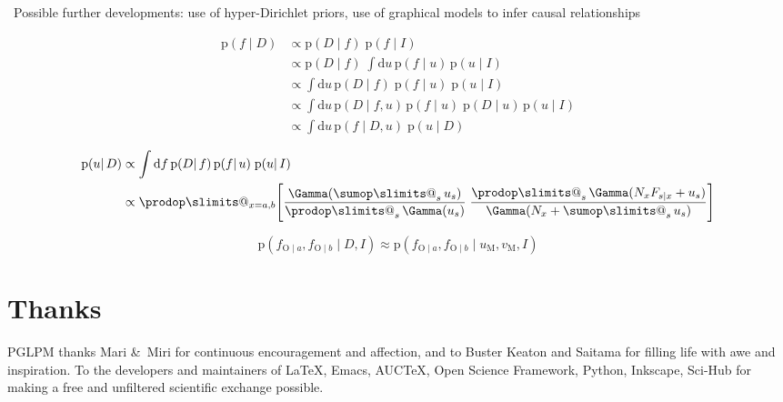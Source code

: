 \documentclass[\ifafour a4paper,12pt,\else a5paper,10pt,\fi%
onecolumn,oneside,article,%
british%
]{memoir}
\makeatletter
\theoremstyle{remark}
\theoremstyle{innote}
\def\sum{\DOTSI\sumop\slimits@}
\def\prod{\DOTSI\prodop\slimits@}
\newcommand*{\citep}{\parencites}
\newcommand*{\amp}{\&}
\newenvironment{acknowledgements}{\section*{Thanks}\addcontentsline{toc}{section}{Thanks}}{\par}
\newcommand*{\di}{\mathrm{d}}%
\newcommand*{\pf}{\mathrm{p}}%
\renewcommand*{\|}{\mathpunct{|}}
\newcommand*{\tprod}{\mathop{\textstyle\prod}\nolimits}
\newcommand*{\tsum}{\mathop{\textstyle\sum}\nolimits}
\newcommand*{\puzzle}{\maltese}
\newcommand{\mynote}[1]{ {\color{notecolour}\puzzle\ #1}}
\newcommand*{\yD}{D}
\newcommand*{\yI}{I}
\newcommand*{\ya}{a}
\newcommand*{\yb}{b}
\newcommand*{\ysA}{\textrm{O}}%
\newcommand*{\yua}{u}
\newcommand*{\yub}{v}
\newcommand*{\yuam}{\yua_{\text{M}}}
\newcommand*{\yubm}{\yub_{\text{M}}}
\makeatother
\begin{document}
\mynote{Possible further developments: use of hyper-Dirichlet priors, use
  of graphical models to infer causal relationships
  \citep{pearl2000_r2009}}

\[
\begin{aligned}
\pf(f \|\yD)  &\propto \pf(\yD \| f)\;\pf(f \| \yI)
  \\
  &\propto \pf(\yD \| f)\;\int\di u\, \pf(f \|u)\, \pf(u\| \yI)
  \\
  &\propto \int\di u\,\pf(\yD \| f)\; \pf(f \|u)\; \pf(u\| \yI)
  \\
  &\propto \int\di u\,\pf(\yD \| f,u)\, \pf(f \|u)\;
    \pf(\yD \| u)\, \pf(u\| \yI)
  \\
  &\propto \int\di u\,\pf(f \| D,u)\;
    \pf(u \| \yD)
\end{aligned}
\]

\[
  \begin{aligned}
    \pf(u \|\yD)
    &\propto \int\di f\, \pf(\yD \| f)\,\pf(f \| u)\;\pf(u \| \yI)
    \\
    &\propto
      \prod_{x=\ya,\yb}\Biggl[ 
      \frac{\Gamma(\tsum_su_s)}
      {\tprod_s\Gamma(u_s)}\;
      \frac{\tprod_s\Gamma(N_xF_{s\|x}+u_s)}
      {\Gamma(N_x+\tsum_su_s)}
       \Biggr]
  \end{aligned}
\]


\[
  \pf(f_{\ysA\|\ya}, f_{\ysA\|\yb} \| \yD, \yI) \approx
  \pf(f_{\ysA\|\ya}, f_{\ysA\|\yb}\| \yuam,\yubm,\yI)
\]



%



\begin{acknowledgements}
  PGLPM thanks Mari \amp\ Miri for continuous encouragement and affection, and
  to Buster Keaton and Saitama for filling life with awe and inspiration.
  To the developers and maintainers of \LaTeX, Emacs, AUC\TeX, Open Science
  Framework, Python, Inkscape, Sci-Hub for making a free and unfiltered
  scientific exchange possible.
\end{acknowledgements}





\printbibliography[prenote=prenote%
]
\end{document}

